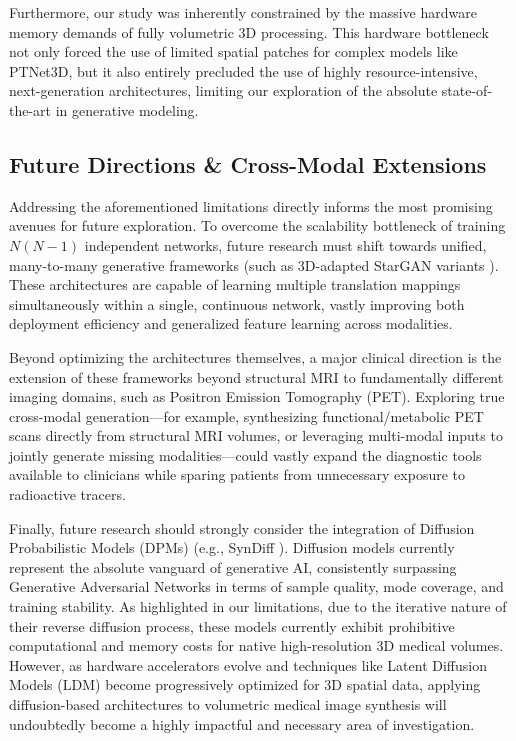 \documentclass[11pt,a4paper]{article}
\begin{document}
Furthermore, our study was inherently constrained by the massive hardware memory demands of fully volumetric 3D processing. This hardware bottleneck not only forced the use of limited spatial patches for complex models like PTNet3D, but it also entirely precluded the use of highly resource-intensive, next-generation architectures, limiting our exploration of the absolute state-of-the-art in generative modeling.

\subsection{Future Directions \& Cross-Modal Extensions}
Addressing the aforementioned limitations directly informs the most promising avenues for future exploration. To overcome the scalability bottleneck of training $N(N-1)$ independent networks, future research must shift towards unified, many-to-many generative frameworks (such as 3D-adapted StarGAN variants \cite{choi2018stargan}). These architectures are capable of learning multiple translation mappings simultaneously within a single, continuous network, vastly improving both deployment efficiency and generalized feature learning across modalities.

Beyond optimizing the architectures themselves, a major clinical direction is the extension of these frameworks beyond structural MRI to fundamentally different imaging domains, such as Positron Emission Tomography (PET). Exploring true cross-modal generation—for example, synthesizing functional/metabolic PET scans directly from structural MRI volumes, or leveraging multi-modal inputs to jointly generate missing modalities—could vastly expand the diagnostic tools available to clinicians while sparing patients from unnecessary exposure to radioactive tracers.

Finally, future research should strongly consider the integration of Diffusion Probabilistic Models (DPMs) (e.g., SynDiff \cite{ozbey2023unsupervised}). Diffusion models currently represent the absolute vanguard of generative AI, consistently surpassing Generative Adversarial Networks in terms of sample quality, mode coverage, and training stability. As highlighted in our limitations, due to the iterative nature of their reverse diffusion process, these models currently exhibit prohibitive computational and memory costs for native high-resolution 3D medical volumes. However, as hardware accelerators evolve and techniques like Latent Diffusion Models (LDM) \cite{pinaya2022brain} become progressively optimized for 3D spatial data, applying diffusion-based architectures to volumetric medical image synthesis will undoubtedly become a highly impactful and necessary area of investigation.
\end{document}
